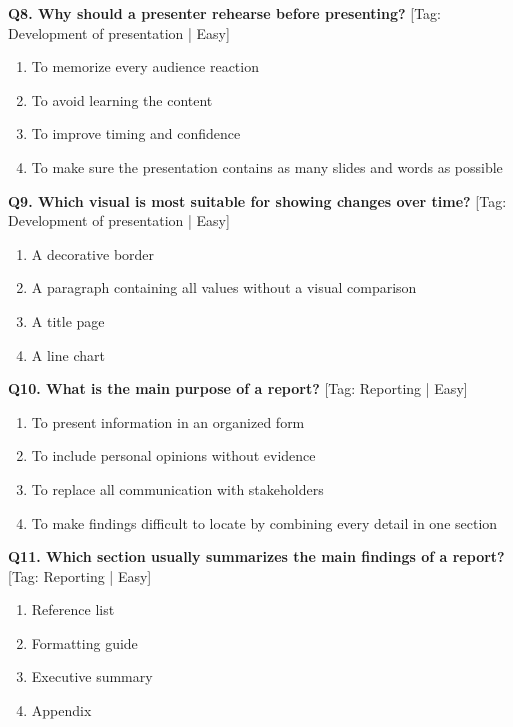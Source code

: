 \noindent\textbf{Q8. Why should a presenter rehearse before presenting?} \hfill [Tag: Development of presentation | Easy]
\begin{enumerate}[label=(\alph*),topsep=2pt,itemsep=1pt,partopsep=0pt,parsep=0pt]
    \item {To memorize every audience reaction}
    \item {To avoid learning the content}
    \item {To improve timing and confidence}
    \item {To make sure the presentation contains as many slides and words as possible}
\end{enumerate}
\vspace{2mm}

\noindent\textbf{Q9. Which visual is most suitable for showing changes over time?} \hfill [Tag: Development of presentation | Easy]
\begin{enumerate}[label=(\alph*),topsep=2pt,itemsep=1pt,partopsep=0pt,parsep=0pt]
    \item {A decorative border}
    \item {A paragraph containing all values without a visual comparison}
    \item {A title page}
    \item {A line chart}
\end{enumerate}
\vspace{2mm}

\noindent\textbf{Q10. What is the main purpose of a report?} \hfill [Tag: Reporting | Easy]
\begin{enumerate}[label=(\alph*),topsep=2pt,itemsep=1pt,partopsep=0pt,parsep=0pt]
    \item {To present information in an organized form}
    \item {To include personal opinions without evidence}
    \item {To replace all communication with stakeholders}
    \item {To make findings difficult to locate by combining every detail in one section}
\end{enumerate}
\vspace{2mm}

\noindent\textbf{Q11. Which section usually summarizes the main findings of a report?} \hfill [Tag: Reporting | Easy]
\begin{enumerate}[label=(\alph*),topsep=2pt,itemsep=1pt,partopsep=0pt,parsep=0pt]
    \item {Reference list}
    \item {Formatting guide}
    \item {Executive summary}
    \item {Appendix}
\end{enumerate}
\vspace{2mm}

